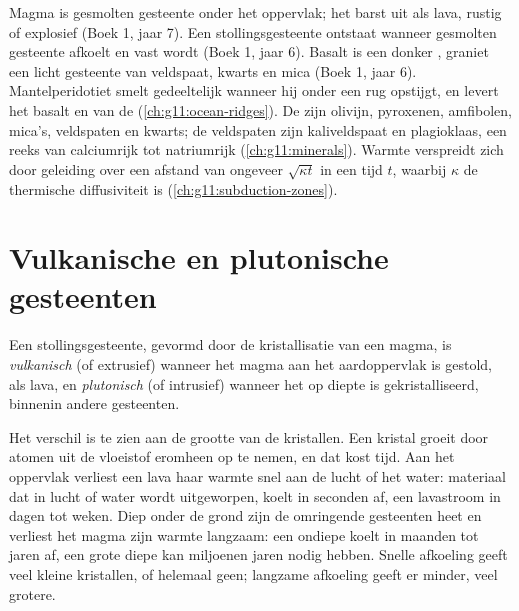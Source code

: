 \begin{recall}
Magma is gesmolten gesteente onder het oppervlak; het barst uit als lava, rustig of
explosief (Boek 1, jaar 7). Een stollingsgesteente ontstaat wanneer gesmolten
gesteente afkoelt en vast wordt (Boek 1, jaar 6). Basalt is een donker , graniet een
licht gesteente van veldspaat, kwarts en mica (Boek 1, jaar 6).
Mantelperidotiet smelt gedeeltelijk wanneer hij onder een rug opstijgt, en levert het basalt en
 van de  (\cref{ch:g11:ocean-ridges}). De  zijn olivijn, pyroxenen, amfibolen, mica's, veldspaten en kwarts;
de veldspaten zijn kaliveldspaat en plagioklaas, een reeks van
calciumrijk tot natriumrijk (\cref{ch:g11:minerals}). Warmte verspreidt zich door
geleiding over een afstand van ongeveer $\sqrt{\kappa t}$ in een tijd $t$, waarbij
$\kappa$ de thermische diffusiviteit is (\cref{ch:g11:subduction-zones}).
\end{recall}

\section{Vulkanische en plutonische gesteenten}

\begin{definition}\label{def:g11:igneous-rocks:volcanic-plutonic}
Een stollingsgesteente, gevormd door de kristallisatie van een magma, is
\emph{vulkanisch}
(of extrusief) wanneer het magma aan het aardoppervlak is gestold, als lava,
en \emph{plutonisch} (of intrusief) wanneer het op diepte
is gekristalliseerd, binnenin andere gesteenten.
\end{definition}

Het verschil is te zien aan de grootte van de kristallen. Een kristal groeit door
atomen uit de vloeistof eromheen op te nemen, en dat kost tijd. Aan het oppervlak
verliest een lava haar warmte snel aan de lucht of het water: materiaal dat in lucht of
water wordt uitgeworpen, koelt in seconden af, een lavastroom in dagen tot weken. Diep
onder de grond zijn de omringende gesteenten heet en verliest het magma zijn warmte langzaam: een ondiepe
 koelt in maanden tot jaren af, een grote diepe kan miljoenen
jaren nodig hebben. Snelle afkoeling geeft veel kleine kristallen, of helemaal geen; langzame afkoeling
geeft er minder, veel grotere.

